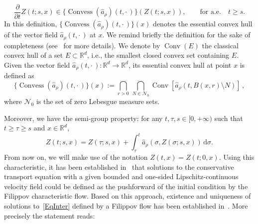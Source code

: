 \documentclass[11pt]{article}
\theoremstyle{definition}
\numberwithin{equation}{section}
\DeclareMathOperator{\Convess}{Convess}
\DeclareMathOperator{\Conv}{Conv}
\newcommand*{\dd}{\mathrm{d}}
\newcommand*{\dsigma}{\dd \sigma}
\newcommand*\RR{\mathbb{R}}
\newcommand*\pa{\partial}
\newcommand*\achapo{\widehat{a}}
\begin{document}
\[
\frac{\pa}{\pa t} Z(t;s,x) \in \{ \Convess(\achapo_{\rho})(t,{\cdot\,})\}(Z(t;s,x)),
\qquad \text{for a.e.} \quad t \geq s.
\]
In this definition, $\{\Convess(\achapo_{\rho})(t,{\cdot\,}) \}(x)$ denotes the essential convex hull of the vector field $\achapo_{\rho}(t,{\cdot\,})$ at $x$. We remind briefly the definition for the sake of completeness (see~\cite{AubinCellina,Filippov} for more details). We denote by $\Conv(E)$ the classical convex hull of a set $E \subset \RR^d$, i.e., the smallest closed convex set containing $E$. Given the vector field $\achapo_{\rho}(t,{\cdot\,}):\RR^d\rightarrow\RR^d$, its essential convex hull at point $x$ is defined as
\[
\{ \Convess (\achapo_{\rho} )(t,{\cdot\,}) \}(x) :=\bigcap_{r>0}\, \bigcap_{N\in \mathcal{N}_0}
\Conv[\achapo_{\rho}(t, B(x,r)\setminus N)]\,,
\]
where $\mathcal{N}_0$ is the set of zero Lebesgue measure sets.

Moreover, we have the semi-group property: for any $t,\tau,s \in [0,+\infty)$ such that $t \geq \tau \geq s$ and $x\in \RR^d$,
\begin{equation}\label{eq:characteristics}
Z(t;s,x)=Z(\tau;s,x)+\int_{\tau}^t \achapo_{\rho}(\sigma,Z(\sigma;s,x))\,\dsigma.
\end{equation}
From now on, we will make use of the notation $Z(t,x)=Z(t;0,x)$. Using this characteristic, it has been established in~\cite{PoupaudRascle} that solutions to the conservative transport equation with a given bounded and one-sided Lipschitz-continuous velocity field could be defined as the pushforward of the initial condition by the Filippov characteristic flow. Based on this approach, existence and uniqueness of solutions to~\eqref{EqInter} defined by a Filippov flow has been established in~\cite{CJLV}. More precisely the statement reads:
\end{document}
